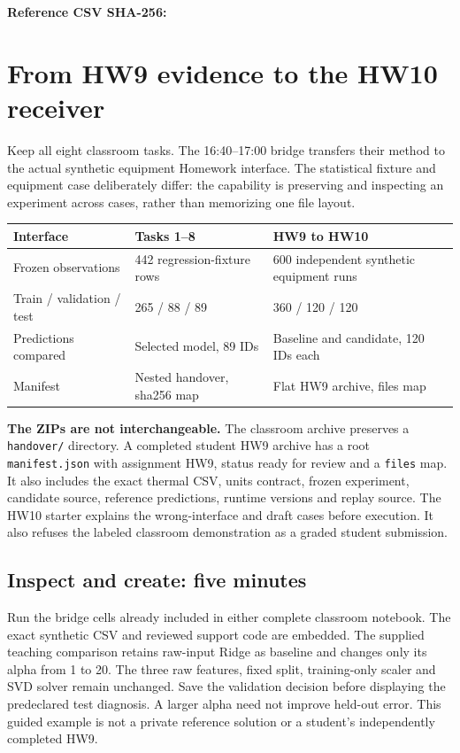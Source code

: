 \noindent\begin{minipage}{\linewidth}\textbf{Reference CSV SHA-256:}\par{}\par\end{minipage}

\section{From HW9 evidence to the HW10 receiver}
Keep all eight classroom tasks. The 16:40--17:00 bridge transfers their method to the actual synthetic equipment Homework interface. The statistical fixture and equipment case deliberately differ: the capability is preserving and inspecting an experiment across cases, rather than memorizing one file layout.

\begin{center}\small
\begin{tabular}{p{.26\linewidth}p{.31\linewidth}p{.31\linewidth}}\toprule
Interface & Tasks 1--8 & HW9 to HW10\\\midrule
Frozen observations & 442 regression-fixture rows & 600 independent synthetic equipment runs\\
Train / validation / test & 265 / 88 / 89 & 360 / 120 / 120\\
Predictions compared & Selected model, 89 IDs & Baseline and candidate, 120 IDs each\\
Manifest & Nested handover, sha256 map & Flat HW9 archive, files map\\
\bottomrule\end{tabular}\end{center}

\textbf{The ZIPs are not interchangeable.} The classroom archive preserves a \texttt{handover/} directory. A completed student HW9 archive has a root \texttt{manifest.json} with assignment HW9, status ready for review and a \texttt{files} map. It also includes the exact thermal CSV, units contract, frozen experiment, candidate source, reference predictions, runtime versions and replay source. The HW10 starter explains the wrong-interface and draft cases before execution. It also refuses the labeled classroom demonstration as a graded student submission.

\subsection{Inspect and create: five minutes}
Run the bridge cells already included in either complete classroom notebook. The exact synthetic CSV and reviewed support code are embedded. The supplied teaching comparison retains raw-input Ridge as baseline and changes only its alpha from 1 to 20. The three raw features, fixed split, training-only scaler and SVD solver remain unchanged. Save the validation decision before displaying the predeclared test diagnosis. A larger alpha need not improve held-out error. This guided example is not a private reference solution or a student's independently completed HW9.

